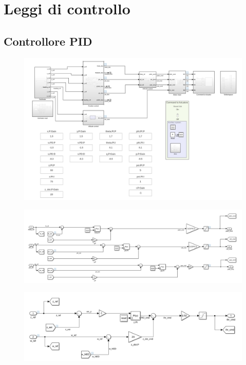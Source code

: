 \section{Leggi di controllo}
\subsection{Controllore PID}

\begin{figure}
	\centering
	\includegraphics[width=1\textwidth]{SistemaQuadrirotore/Figure/completopid}
\end{figure}

\begin{figure}
	\centering
	\includegraphics[width=1\textwidth]{SistemaQuadrirotore/Figure/attitudecontrollerpid}
\end{figure}

\begin{figure}
	\centering
	\includegraphics[width=1\textwidth]{SistemaQuadrirotore/Figure/altitudecontrollerpid}
\end{figure}

